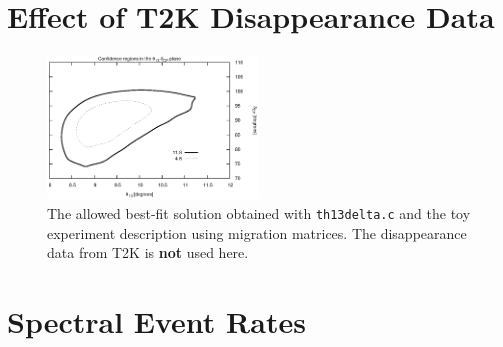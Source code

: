 \documentclass[12pt,a4paper]{article}
\theoremstyle{dotless}
\begin{document}
\newpage
\begin{appendix}
\section{Effect of T2K Disappearance Data}

\begin{figure}[h!]
  \begin{center}
    \includegraphics[width=0.5\textwidth]{WITHOUT_T2K.eps}   
      \end{center}
  \vspace{-0.7 cm}
  \caption{\small The allowed best-fit solution obtained with {\tt th13delta.c}
  and the toy experiment description using migration matrices. The disappearance data from
  T2K is {\bf not} used here.}
  \label{fig:withoutT2K}
\end{figure}

\section{Spectral Event Rates}

\footnotesize \tt

\begin {center}
\begin{tabular}{lcl}


\end{tabular}
\end{center}
\end{appendix}
\end{document}

